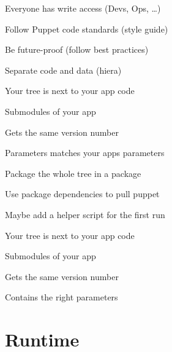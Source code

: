 \begin{iframe}
\item Everyone has write access (Devs, Ops, \dots)
\item Follow Puppet code standards (style guide)
\item Be future-proof (follow best practices)
\item Separate code and data (hiera)
\end{iframe}

\begin{iframe}
\item Your tree is next to your app code
\item Submodules of your app
\item Gets the same version number
\item Parameters matches your apps parameters
\end{iframe}

\begin{iframe}
\item Package the whole tree in a package
\item Use package dependencies to pull puppet
\item Maybe add a helper script for the first run
\end{iframe}

\begin{iframe}
\item Your tree is next to your app code
\item Submodules of your app
\item Gets the same version number
\item Contains the right parameters
\end{iframe}


\section{Runtime}


